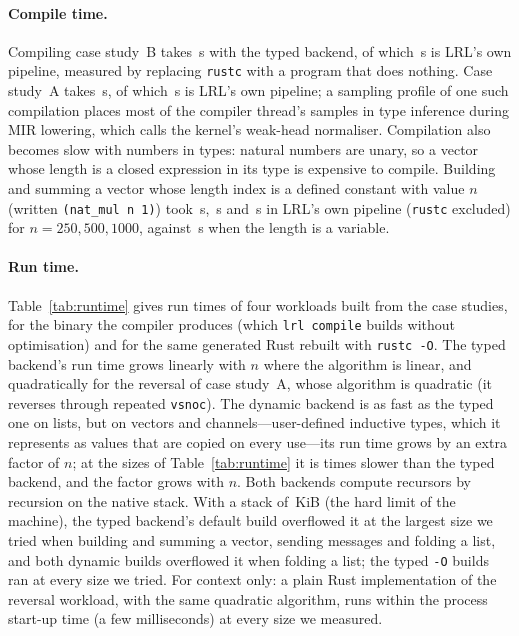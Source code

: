 \paragraph{Compile time.}
Compiling case study~B takes \BenchProtocolTypedTotal\,s with the typed backend, of which \BenchProtocolTypedFront\,s is LRL's own pipeline, measured by replacing \texttt{rustc} with a program that does nothing.
Case study~A takes \BenchVectorsTypedTotal\,s, of which \BenchVectorsTypedFront\,s is LRL's own pipeline; a sampling profile of one such compilation places most of the compiler thread's samples in type inference during MIR lowering, which calls the kernel's weak-head normaliser.
Compilation also becomes slow with numbers in types: natural numbers are unary, so a vector whose length is a closed expression in its type is expensive to compile.
Building and summing a vector whose length index is a defined constant with value $n$ (written \lstinline|(nat_mul n 1)|) took \BenchClosedIndexA\,s, \BenchClosedIndexB\,s and \BenchClosedIndexC\,s in LRL's own pipeline (\texttt{rustc} excluded) for $n = 250, 500, 1000$, against \BenchVarIndexRange\,s when the length is a variable.

\paragraph{Run time.}
Table~\ref{tab:runtime} gives run times of four workloads built from the case studies, for the binary the compiler produces (which \texttt{lrl compile} builds without optimisation) and for the same generated Rust rebuilt with \texttt{rustc -O}.
The typed backend's run time grows linearly with $n$ where the algorithm is linear, and quadratically for the reversal of case study~A, whose algorithm is quadratic (it reverses through repeated \lstinline|vsnoc|).
The dynamic backend is as fast as the typed one on lists, but on vectors and channels---user-defined inductive types, which it represents as values that are copied on every use---its run time grows by an extra factor of $n$; at the sizes of Table~\ref{tab:runtime} it is \BenchDynTypedRatioRange{} times slower than the typed backend, and the factor grows with $n$.
Both backends compute recursors by recursion on the native stack. With a stack of \BenchStackKiB\,KiB (the hard limit of the machine), the typed backend's default build overflowed it at the largest size we tried when building and summing a vector, sending messages and folding a list, and both dynamic builds overflowed it when folding a list; the typed \texttt{-O} builds ran at every size we tried.
For context only: a plain Rust implementation of the reversal workload, with the same quadratic algorithm, runs within the process start-up time (a few milliseconds) at every size we measured.

